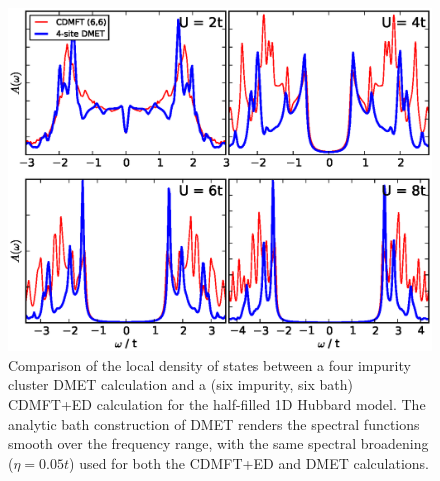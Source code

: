 \documentclass[aps,twocolumn,nobibnotes]{revtex4}
\begin{document}
\begin{figure}
\begin{center}
    \vspace{-2mm}
\includegraphics[scale=0.425]{Plots/1D_Spectra/1D_Hub_Spectra.eps}
\end{center}
    \vspace{-5mm}
\caption{Comparison of the local density of states between a four impurity cluster DMET calculation and a
(six impurity, six bath) CDMFT+ED calculation for the half-filled 1D Hubbard model. The analytic bath construction
of DMET renders the spectral functions smooth over the frequency range, with the same spectral broadening ($\eta=0.05t$) used for
both the CDMFT+ED and DMET calculations.}
\label{1D_DOS}
\end{figure}
\end{document}
